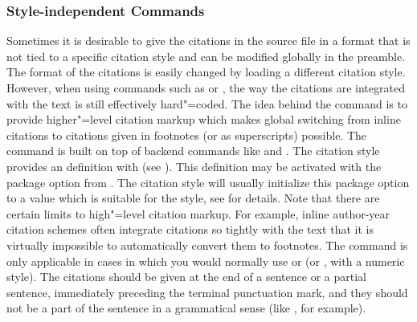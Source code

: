 \documentclass{ltxdockit}[2011/03/25]
\begin{document}
\subsubsection{Style-independent Commands}
\label{use:cit:aut}

Sometimes it is desirable to give the citations in the source file in a format that is not tied to a specific citation style and can be modified globally in the preamble. The format of the citations is easily changed by loading a different citation style. However, when using commands such as  or , the way the citations are integrated with the text is still effectively hard"=coded. The idea behind the  command is to provide higher"=level citation markup which makes global switching from inline citations to citations given in footnotes (or as superscripts) possible. The  command is built on top of backend commands like  and . The citation style provides an  definition with  (see ). This definition may be activated with the  package option from . The citation style will usually initialize this package option to a value which is suitable for the style, see  for details. Note that there are certain limits to high"=level citation markup. For example, inline author-year citation schemes often integrate citations so tightly with the text that it is virtually impossible to automatically convert them to footnotes. The  command is only applicable in cases in which you would normally use  or  (or , with a numeric style). The citations should be given at the end of a sentence or a partial sentence, immediately preceding the terminal punctuation mark, and they should not be a part of the sentence in a grammatical sense (like , for example).
\end{document}
